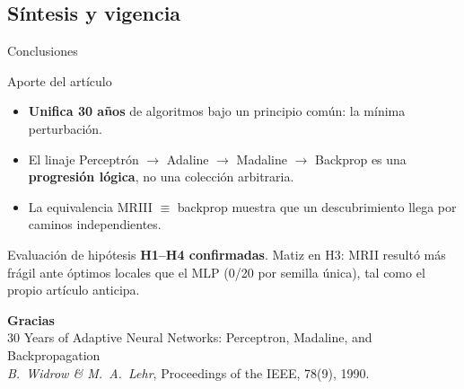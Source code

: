 \documentclass[aspectratio=169, 11pt, xcolor={dvipsnames,table}]{beamer}
\newcommand{\azul}[1]{\textcolor{UsachAzul}{#1}}
\begin{document}
\subsection{Síntesis y vigencia}
\begin{frame}{Conclusiones}
\begin{block}{Aporte del artículo}
\begin{itemize}
  \item \textbf{Unifica 30 años} de algoritmos bajo un principio común: la \azul{mínima perturbación}.
  \item El linaje Perceptrón $\to$ Adaline $\to$ Madaline $\to$ Backprop es una \textbf{progresión lógica}, no una colección arbitraria.
  \item La equivalencia \azul{MRIII $\equiv$ backprop} muestra que un descubrimiento llega por caminos independientes.
\end{itemize}
\end{block}
\begin{alertblock}{Evaluación de hipótesis}
\textbf{H1--H4 confirmadas}. Matiz en H3: MRII resultó más frágil ante óptimos locales que el MLP
(0/20 por semilla única), tal como el propio artículo anticipa.
\end{alertblock}
\end{frame}


\begin{frame}[plain]
\vfill
\begin{center}
{\Huge\bfseries\azul{Gracias}}\\[10pt]
\footnotesize
30 Years of Adaptive Neural Networks: Perceptron, Madaline, and Backpropagation\\
\emph{B.\ Widrow \& M.\ A.\ Lehr}, Proceedings of the IEEE, 78(9), 1990.
\end{center}
\vfill
\end{frame}
\end{document}
